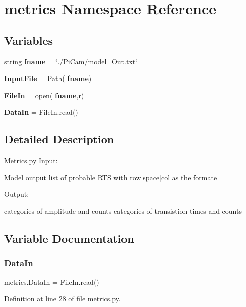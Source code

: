\section{metrics Namespace Reference}
\label{namespacemetrics}
\subsection*{Variables}
\begin{DoxyCompactItemize}
\item 
string \textbf{ fname} = \char`\"{}./Pi\+Cam/model\+\_\+\+Out.\+txt\char`\"{}
\item 
\textbf{ Input\+File} = Path(\textbf{ fname})
\item 
\textbf{ File\+In} = open(\textbf{ fname},\textquotesingle{}r\textquotesingle{})
\item 
\textbf{ Data\+In} = File\+In.\+read()
\end{DoxyCompactItemize}


\subsection{Detailed Description}
\begin{DoxyVerb}Metrics.py
Input:

Model output list of probable RTS with row[space]col as the formate

Output:

categories of amplitude and counts
categories of transistion times and counts\end{DoxyVerb}
 

\subsection{Variable Documentation}
\mbox{\label{namespacemetrics_a3319e734594da7e77e6cc4b501d2ae86}} 
\subsubsection{Data\+In}
{\footnotesize\ttfamily metrics.\+Data\+In = File\+In.\+read()}



Definition at line 28 of file metrics.\+py.

\mbox{\label{namespacemetrics_a2e8f4a03f5591579feac373d7af6e612}} 
